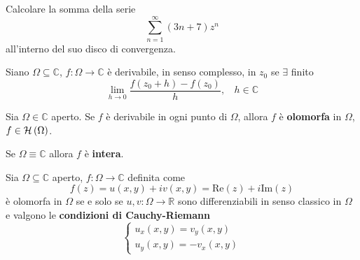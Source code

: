 Calcolare la somma della serie
\begin{equation*}
\sum\limits ^{\infty }_{n=1}\left( 3n+7\right) z^{n}
\end{equation*}
all'interno del suo disco di convergenza.
\ParteSoluzioni
\Soluzione
\begin{defn}
Siano $\Omega \subseteq \mathbb{C}$, $f:\Omega \rightarrow \mathbb{C}$ è derivabile, in senso complesso, in $z_{0}$ se $\exists $ finito
\begin{equation*}
\lim\limits _{h\rightarrow 0}\frac{f\left( z_{0} +h\right) -f\left( z_{0}\right)}{h} ,\ \ \ \ h\in \mathbb{C}
\end{equation*}
\end{defn}
\begin{defn}
Sia $\Omega \in \mathbb{C}$ aperto. Se $f$ è derivabile in ogni punto di $\Omega $, allora $f$ è \textbf{olomorfa} in $\Omega $, $f\in \mathcal{H} \left( \Omega \right)$.
\end{defn}
\begin{rem}
Se $\Omega \equiv \mathbb{C}$ allora $f$ è \textbf{intera}.
\end{rem}
\begin{thm}
 Sia $\Omega \subseteq \mathbb{C}$ aperto, $f:\Omega \rightarrow \mathbb{C}$ definita come
\begin{equation*}
f\left( z\right) =u\left( x,y\right) +iv\left( x,y\right) =\mathrm{Re}\left( z\right) +i\mathrm{Im}\left( z\right)
\end{equation*}
è olomorfa in $\Omega $ se e solo se $u,v:\Omega \rightarrow \mathbb{R}$ sono differenziabili in senso classico in $\Omega $ e valgono le \textbf{condizioni di Cauchy-Riemann}
\begin{equation}
\begin{cases}
u_{x}\left( x,y\right) =v_{y}\left( x,y\right)\\
u_{y}\left( x,y\right) =-v_{x}\left( x,y\right)
\end{cases}
\end{equation}
\end{thm}
